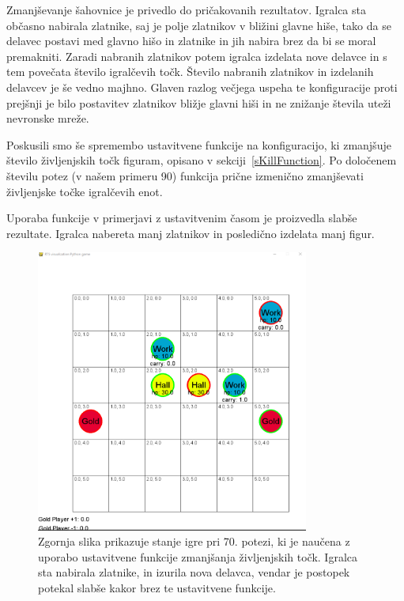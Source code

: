 \documentclass[a4paper, 12pt]{book}
\begin{document}
Zmanjševanje šahovnice je privedlo do pričakovanih rezultatov.
Igralca sta občasno nabirala zlatnike, saj je polje zlatnikov v bližini glavne hiše, tako da se delavec postavi med glavno hišo in zlatnike in jih nabira brez da bi se moral premakniti.
Zaradi nabranih zlatnikov potem igralca izdelata nove delavce in s tem povečata število igralčevih točk.
Število nabranih zlatnikov in izdelanih delavcev je še vedno majhno.
Glaven razlog večjega uspeha te konfiguracije proti prejšnji je bilo postavitev zlatnikov bližje glavni hiši in ne znižanje števila uteži nevronske mreže.


Poskusili smo še spremembo ustavitvene funkcije na konfiguracijo, ki zmanjšuje število življenjskih točk figuram, opisano v sekciji~\ref{sKillFunction}.
Po določenem številu potez (v našem primeru 90) funkcija prične izmenično zmanjševati življenjske točke igralčevih enot.

Uporaba funkcije v primerjavi z ustavitvenim časom je proizvedla slabše rezultate.
Igralca nabereta manj zlatnikov in posledično izdelata manj figur.

\begin{figure}[h]
	\begin{center}
		\includegraphics[width=0.8\textwidth]{photos/killFunction.pdf}
	\end{center}
	\caption{Zgornja slika prikazuje stanje igre pri 70. potezi, ki je naučena z uporabo ustavitvene funkcije zmanjšanja življenjskih točk. 
		Igralca sta nabirala zlatnike, in izurila nova delavca, vendar je postopek potekal slabše kakor brez te ustavitvene funkcije. }
	\label{vizualizacijaRezultatovKillFunction}
\end{figure}
\end{document}
